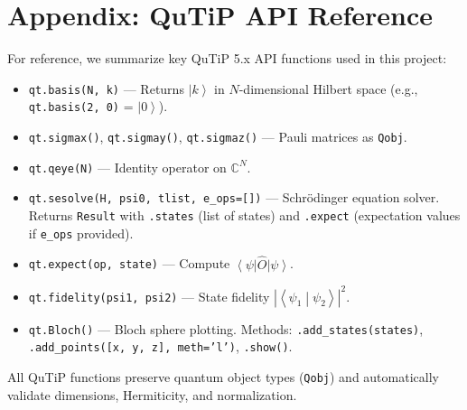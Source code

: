 \documentclass[11pt,a4paper]{article}
\theoremstyle{definition}
\theoremstyle{remark}
\newcommand{\ket}[1]{\left|#1\right\rangle}
\newcommand{\bra}[1]{\left\langle#1\right|}
\newcommand{\braket}[2]{\left\langle#1\middle|#2\right\rangle}
\newcommand{\CC}{\mathbb{C}}
\begin{document}
\appendix
\section{Appendix: QuTiP API Reference}
\label{app:qutip}

For reference, we summarize key QuTiP 5.x API functions used in this project:

\begin{itemize}
    \item \texttt{qt.basis(N, k)} — Returns $\ket{k}$ in $N$-dimensional Hilbert space (e.g., \texttt{qt.basis(2, 0)} = $\ket{0}$).
    \item \texttt{qt.sigmax()}, \texttt{qt.sigmay()}, \texttt{qt.sigmaz()} — Pauli matrices as \texttt{Qobj}.
    \item \texttt{qt.qeye(N)} — Identity operator on $\CC^N$.
    \item \texttt{qt.sesolve(H, psi0, tlist, e\_ops=[])} — Schrödinger equation solver. Returns \texttt{Result} with \texttt{.states} (list of states) and \texttt{.expect} (expectation values if \texttt{e\_ops} provided).
    \item \texttt{qt.expect(op, state)} — Compute $\bra{\psi} \hat{O} \ket{\psi}$.
    \item \texttt{qt.fidelity(psi1, psi2)} — State fidelity $|\braket{\psi_1}{\psi_2}|^2$.
    \item \texttt{qt.Bloch()} — Bloch sphere plotting. Methods: \texttt{.add\_states(states)}, \texttt{.add\_points([x, y, z], meth='l')}, \texttt{.show()}.
\end{itemize}

All QuTiP functions preserve quantum object types (\texttt{Qobj}) and automatically validate dimensions, Hermiticity, and normalization.
\end{document}
